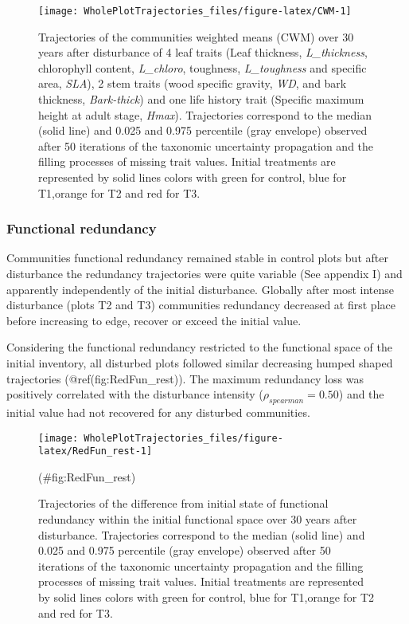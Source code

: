 \documentclass[fleqn,10pt]{ArtEcoFoG} %
\theoremstyle{definition}
\theoremstyle{definition}
\theoremstyle{definition}
\theoremstyle{remark}
\begin{document}
\begin{figure*}

{\centering \texttt{[image: WholePlotTrajectories\_files/figure-latex/CWM-1]} 

}

\caption{Trajectories of the communities weighted means (CWM) over 30 years after disturbance of 4 leaf traits (Leaf thickness, \emph{L\_thickness}, chlorophyll content, \emph{L\_chloro}, toughness, \emph{L\_toughness} and specific area, \emph{SLA}), 2 stem traits (wood specific gravity, \emph{WD}, and bark thickness, \emph{Bark-thick}) and one life history trait (Specific maximum height at adult stage, \emph{Hmax}). Trajectories correspond to the median (solid line) and 0.025 and 0.975 percentile (gray envelope) observed after 50 iterations of the taxonomic uncertainty propagation and the filling processes of missing trait values. Initial treatments are represented by solid lines colors with green for control, blue for T1,orange for T2 and red for T3.}\label{fig:CWM}
\end{figure*}

\subsubsection{Functional redundancy}\label{functional-redundancy}

Communities functional redundancy remained stable in control
plots but after disturbance the redundancy trajectories were quite
variable (See appendix I) and apparently independently of the initial
disturbance. Globally after most intense disturbance (plots T2 and T3)
communities redundancy decreased at first place before increasing to
edge, recover or exceed the initial value.

Considering the functional redundancy restricted to the functional space
of the initial inventory, all disturbed plots followed similar
decreasing humped shaped trajectories (@ref(fig:RedFun\_rest)). The
maximum redundancy loss was positively correlated with the disturbance
intensity (\(\rho_{spearman}=0.50\)) and the initial value had not
recovered for any disturbed communities.

\begin{figure}

{\centering \texttt{[image: WholePlotTrajectories\_files/figure-latex/RedFun\_rest-1]} 

}

\caption{Trajectories of the difference from initial state of functional redundancy within the initial functional space over 30 years after disturbance. Trajectories correspond to the median (solid line) and 0.025 and 0.975 percentile (gray envelope) observed after 50 iterations of the taxonomic uncertainty propagation and the filling processes of missing trait values. Initial treatments are represented by solid lines colors with green for control, blue for T1,orange for T2 and red for T3.}(\#fig:RedFun_rest)
\end{figure}
\end{document}
